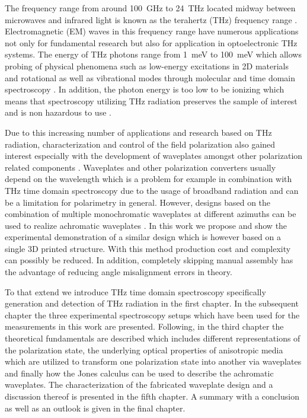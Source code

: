 The frequency range from around \SI{100}{\giga \hertz} to \SI{24}{\tera \hertz} located midway between microwaves and infrared light is known as the terahertz (THz) frequency range \cite{Jepsen2011}. Electromagnetic (EM) waves in this frequency range have numerous applications not only for fundamental research but also for application in optoelectronic THz systems. The energy of THz photons range from \SI{1}{\milli \electronvolt} to \SI{100}{\milli \electronvolt} which allows probing of physical phenomena such as low-energy excitations in 2D materials \cite{Winnerl2018} and rotational as well as vibrational modes through molecular and time domain spectroscopy \cite{Walther2002, Giesen2005, Baxter2011, Mittleman2003}. In addition, the photon energy is too low to be ionizing which means that spectroscopy utilizing THz radiation preserves the sample of interest and is non hazardous to use \cite{Jepsen2011}.

Due to this increasing number of applications and research based on THz radiation, characterization and control of the field polarization also gained interest especially with the development of waveplates amongst other polarization related components \cite{Castro-Camus2012}. Waveplates and other polarization converters usually depend on the wavelength which is a problem for example in combination with THz time domain spectroscopy due to the usage of broadband radiation and can be a limitation for polarimetry in general. However, designs based on the combination of multiple monochromatic waveplates at different azimuths can be used to realize achromatic waveplates \cite{Wu2020, Masson2006, Ivanov2012, Herrera-Fernandez2015}. In this work we propose and show the experimental demonstration of a similar design which is however based on a single 3D printed structure. With this method production cost and complexity can possibly be reduced. In addition, completely skipping manual assembly has the advantage of reducing angle misalignment errors in theory.

To that extend we introduce THz time domain spectroscopy specifically generation and detection of THz radiation in the first chapter. In the subsequent chapter the three experimental spectroscopy setups which have been used for the measurements in this work are presented. Following, in the third chapter the theoretical fundamentals are described which includes different representations of the polarization state, the underlying optical properties of anisotropic media which are utilized to transform one polarization state into another via waveplates and finally how the Jones calculus can be used to describe the achromatic waveplates. The characterization of the fabricated waveplate design and a discussion thereof is presented in the fifth chapter. A summary with a conclusion as well as an outlook is given in the final chapter.

